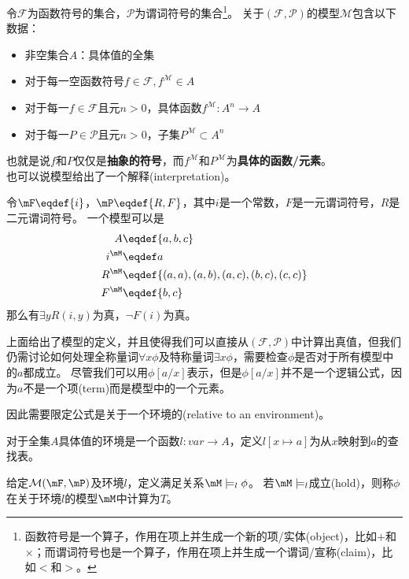 \begin{definition}[模型(model)]
令$\mathcal{F}$为函数符号的集合，$\mathcal{P}$为谓词符号的集合\footnote{函数符号是一个算子，作用在项上并生成一个新的项/实体(object)，比如$+$和$\times$；而谓词符号也是一个算子，作用在项上并生成一个谓词/宣称(claim)，比如$<$和$>$。}。
关于$(\mathcal{F},\mathcal{P})$的模型$\mathcal{M}$包含以下数据：
\begin{itemize}
	\item 非空集合$A$：具体值的全集
	\item 对于每一空函数符号$f\in\mathcal{F},f^{\mathcal{M}}\in A$
	\item 对于每一$f\in\mathcal{F}$且元$n>0$，具体函数$f^{\mathcal{M}}:A^n\to A$
	\item 对于每一$P\in\mathcal{P}$且元$n>0$，子集$P^\mathcal{M}\subset A^n$
\end{itemize}
也就是说$f$和$P$仅仅是\textbf{抽象的符号}，而$f^{\mathcal{M}}$和$P^{\mathcal{M}}$为\textbf{具体的函数/元素}。\\
也可以说模型给出了一个解释(interpretation)。
\end{definition}
\begin{example}
令$\mF\eqdef\{i\}$，$\mP\eqdef\{R,F\}$，其中$i$是一个常数，$F$是一元谓词符号，$R$是二元谓词符号。
一个模型可以是
\[\begin{aligned}
A &\eqdef\{a,b,c\}\\
i^{\mM} &\eqdef a\\
R^{\mM} &\eqdef\{(a,a),(a,b),(a,c),(b,c),(c,c)\}\\
F^{\mM} &\eqdef\{b,c\}
\end{aligned}\]
那么有$\exists yR(i,y)$为真，$\lnot F(i)$为真。
\end{example}

上面给出了模型的定义，并且使得我们可以直接从$(\mathcal{F},\mathcal{P})$中计算出真值，但我们仍需讨论如何处理全称量词$\forall x\phi$及特称量词$\exists x\phi$，需要检查$\phi$是否对于所有模型中的$a$都成立。
尽管我们可以用$\phi[a/x]$表示，但是$\phi[a/x]$并不是一个逻辑公式，因为$a$不是一个项(term)而是模型中的一个元素。

因此需要限定公式是关于一个环境的(relative to an environment)。
\begin{definition}
对于全集$A$具体值的环境是一个函数$l:var\to A$，定义$l[x\mapsto a]$为从$x$映射到$a$的查找表。
\end{definition}

\begin{definition}
给定$\mathcal{M}(\mF,\mP)$及环境$l$，定义满足关系$\mM\models_l\phi$。
若$\mM\models_l$成立(hold)，则称$\phi$在关于环境$l$的模型$\mM$中计算为$T$。
\end{definition}

